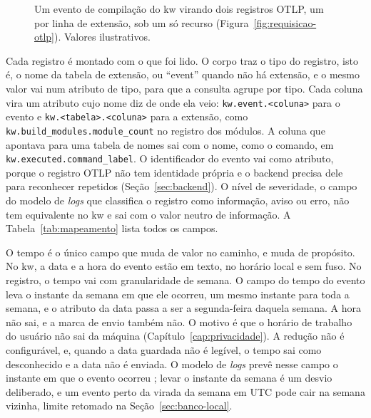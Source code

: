 \begin{figure}[!ht]
  \centering
  \resizebox{\textwidth}{!}{}
  \caption{Um evento de compilação do kw virando dois registros OTLP, um por
    linha de extensão, sob um só recurso (Figura~\ref{fig:requisicao-otlp}). Valores
    ilustrativos.}
  \label{fig:evento-registro}
\end{figure}

Cada registro é montado com o que foi lido. O corpo traz o tipo do registro,
isto é, o nome da tabela de extensão, ou \enquote{event} quando não há
extensão, e o mesmo valor vai num atributo de tipo, para que a consulta agrupe
por tipo. Cada coluna vira um atributo cujo nome diz de onde ela veio:
\texttt{kw.event.<coluna>} para o evento e \texttt{kw.<tabela>.<coluna>} para a
extensão, como \texttt{kw.build\_modules.module\_count} no registro dos
módulos. A coluna que apontava para uma tabela de nomes sai com o nome, como o
comando, em \texttt{kw.executed.command\_label}. O identificador do evento vai
como atributo, porque o registro OTLP não tem identidade própria e o backend
precisa dele para reconhecer repetidos (Seção~\ref{sec:backend}). O nível de
severidade, o campo do modelo de \textit{logs} que classifica o registro como
informação, aviso ou erro, não tem equivalente no kw e sai com o valor neutro
de informação. A Tabela~\ref{tab:mapeamento} lista todos os campos.



O tempo é o único campo que muda de valor no caminho, e muda de propósito. No
kw, a data e a hora do evento estão em texto, no horário local e sem fuso. No
registro, o tempo vai com granularidade de semana. O campo do tempo do evento
leva o instante da semana em que ele ocorreu, um mesmo instante para toda a
semana, e o atributo da data passa a ser a segunda-feira daquela semana. A
hora não sai, e a marca de envio também não. O motivo é que o horário de
trabalho do usuário não sai da máquina (Capítulo~\ref{cap:privacidade}). A
redução não é configurável, e, quando a data guardada não é legível, o tempo
sai como desconhecido e a data não é enviada. O modelo de \textit{logs} prevê
nesse campo o instante em que o evento ocorreu \citep{otel_logs_data_model};
levar o instante da semana é um desvio deliberado, e um evento perto da virada
da semana em UTC pode cair na semana vizinha, limite retomado na
Seção~\ref{sec:banco-local}.

